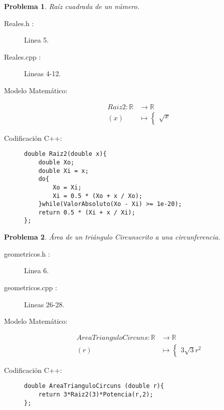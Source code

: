 \documentclass{article}
\theoremstyle{plain}
\theoremstyle{definition}
\newtheorem{problem}{Problema}
\begin{document}
\begin{problem} \emph{Raíz cuadrada de un número.}\\
\begin{description}
\item[Reales.h :] Linea 5. \item[Reales.cpp :] Lineas 4-12.

\item[Modelo Matemático:]
\begin{align*}
Raiz2: \mathbb{R} &\to \mathbb{R}\\
(x) &\mapsto \begin{cases}
\sqrt{x}
\end{cases}
\end{align*}
%
\item[Codificación \textsf{C++}:]\hfill
%
\begin{verbatim}
double Raiz2(double x){
    double Xo;
    double Xi = x;
    do{
        Xo = Xi;
        Xi = 0.5 * (Xo + x / Xo);
    }while(ValorAbsoluto(Xo - Xi) >= 1e-20);
    return 0.5 * (Xi + x / Xi);
};
\end{verbatim}
\end{description}
\end{problem}

\begin{problem} \emph{Área de un triángulo Circunscrito a una circunferencia.}\\
\begin{description}
\item[geometricos.h :] Linea 6. \item[geometricos.cpp :] Lineas 26-28.

\item[Modelo Matemático:]
\begin{align*}
AreaTrianguloCircuns: \mathbb{R} &\to \mathbb{R}\\
(r) &\mapsto \begin{cases}
3\sqrt{3}r^{2}
\end{cases}
\end{align*}
%
\item[Codificación \textsf{C++}:]\hfill
%
\begin{verbatim}
double AreaTrianguloCircuns (double r){
    return 3*Raiz2(3)*Potencia(r,2);
};
\end{verbatim}
\end{description}
\end{problem}
\end{document}
